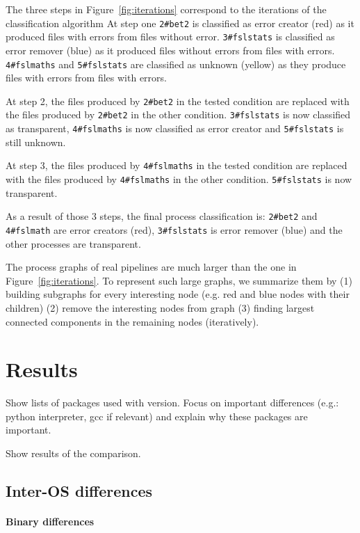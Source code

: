 \documentclass{article}
\begin{document}
The three steps in Figure~\ref{fig:iterations} correspond to the 
iterations of the classification algorithm At step one \texttt{2\#bet2} 
is classified as error creator (red) as it produced files with errors 
from files without error. \texttt{3\#fslstats} is classified as error 
remover (blue) as it produced files without errors from files with 
errors. \texttt{4\#fslmaths} and \texttt{5\#fslstats} are classified as 
unknown (yellow) as they produce files with errors from files with errors.

At step 2, the files produced by \texttt{2\#bet2} in the tested 
condition are replaced with the files produced by \texttt{2\#bet2} in 
the other condition. \texttt{3\#fslstats} is now classified as transparent, \texttt{4\#fslmaths} is now classified
as error creator and \texttt{5\#fslstats} is still unknown.

 At step 3, the files produced by \texttt{4\#fslmaths} in the tested 
 condition are replaced with the files produced by \texttt{4\#fslmaths} 
 in the other condition. \texttt{5\#fslstats} is now transparent.
 
 As a result of those 3 steps, the final process classification is: 
 \texttt{2\#bet2} and \texttt{4\#fslmath} are error creators (red), 
 \texttt{3\#fslstats} is error remover (blue) and the other processes 
 are transparent.

The process graphs of real pipelines are much larger than the one in 
Figure~\ref{fig:iterations}. To represent such large graphs, we 
summarize them by (1) building subgraphs for every interesting node 
(e.g. red and blue nodes with their children) (2) remove the 
interesting nodes from graph (3) finding largest connected components 
in the remaining nodes (iteratively).

\section{Results}

Show lists of packages used with version. Focus on important
differences (e.g.: python interpreter, gcc if relevant) and explain
why these packages are important.

Show results of the comparison.

\subsection{Inter-OS differences}


\paragraph{Binary differences}
\end{document}
